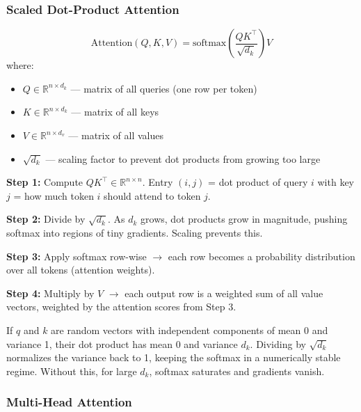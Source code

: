 \documentclass[11pt, a4paper]{article}
\begin{document}
\subsubsection{Scaled Dot-Product Attention}

\begin{defbox}
\[
\text{Attention}(Q, K, V) = \text{softmax}\!\left(\frac{QK^\top}{\sqrt{d_k}}\right) V
\]
where:
\begin{itemize}[leftmargin=1.5em]
  \item $Q \in \mathbb{R}^{n \times d_k}$ --- matrix of all queries (one row per token)
  \item $K \in \mathbb{R}^{n \times d_k}$ --- matrix of all keys
  \item $V \in \mathbb{R}^{n \times d_v}$ --- matrix of all values
  \item $\sqrt{d_k}$ --- scaling factor to prevent dot products from growing too large
\end{itemize}
\end{defbox}

\begin{exbox}
\textbf{Step 1:} Compute $QK^\top \in \mathbb{R}^{n \times n}$. Entry $(i,j)$ = dot product of query $i$ with key $j$ = how much token $i$ should attend to token $j$.

\textbf{Step 2:} Divide by $\sqrt{d_k}$. As $d_k$ grows, dot products grow in magnitude, pushing softmax into regions of tiny gradients. Scaling prevents this.

\textbf{Step 3:} Apply softmax row-wise $\to$ each row becomes a probability distribution over all tokens (attention weights).

\textbf{Step 4:} Multiply by $V$ $\to$ each output row is a weighted sum of all value vectors, weighted by the attention scores from Step 3.
\end{exbox}

\begin{notebox}
If $q$ and $k$ are random vectors with independent components of mean 0 and variance 1, their dot product has mean 0 and variance $d_k$. Dividing by $\sqrt{d_k}$ normalizes the variance back to 1, keeping the softmax in a numerically stable regime. Without this, for large $d_k$, softmax saturates and gradients vanish.
\end{notebox}

\subsubsection{Multi-Head Attention}
\end{document}
